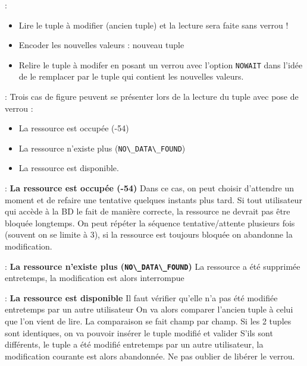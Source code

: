 \documentclass[10pt]{beamer}
\begin{document}
\begin{frame}{\secname : \subsecname}
    \begin{itemize}
        \item  Lire le tuple à modifier (ancien tuple) et la lecture sera faite sans verrou !
        \item Encoder les nouvelles valeurs : nouveau tuple
        \item Relire le tuple à modifer en posant un verrou avec l'option \lstinline[language=plsql]!NOWAIT! dans l'idée de le remplacer par le tuple qui contient les nouvelles valeurs.
    \end{itemize}
\end{frame}

\begin{frame}{\secname : \subsecname}
    Trois cas de figure peuvent se présenter lors de la lecture du tuple avec pose de verrou :
    \begin{itemize}
        \item La ressource est occupée (-54)
        \item La ressource n'existe plus (\lstinline[language=plsql]!NO\_DATA\_FOUND!)
        \item La ressource est disponible.
    \end{itemize}
\end{frame}

\begin{frame}{\secname : \subsecname}
    \textbf{La ressource est occupée (-54)}
    Dans ce cas, on peut choisir d'attendre un moment et de refaire une tentative quelques instants plus tard.
    Si tout utilisateur qui accède à la BD le fait de manière correcte, la ressource ne devrait pas être bloquée longtemps.
    On peut répéter la séquence tentative/attente plusieurs fois (souvent on se limite à 3), si la ressource est toujours bloquée on abandonne la modification.
\end{frame}

\begin{frame}{\secname : \subsecname}
    \textbf{La ressource n'existe plus (\lstinline[language=plsql]!NO\_DATA\_FOUND!)}
    La ressource a été supprimée entretemps, la modification est alors interrompue
\end{frame}
\begin{frame}{\secname : \subsecname}
    \textbf{La ressource est disponible}
    Il faut vérifier qu'elle n'a pas été modifiée entretemps par un autre utilisateur
    On va alors comparer l'ancien tuple à celui que l'on vient de lire.  La comparaison se fait champ par champ.
    Si les 2 tuples sont identiques, on va pouvoir insérer le tuple modifié et valider
    S'ils sont différents, le tuple a été modifié entretemps par un autre utilisateur, la modification courante est alors abandonnée.  Ne pas oublier de libérer le verrou.
\end{frame}
\end{document}
